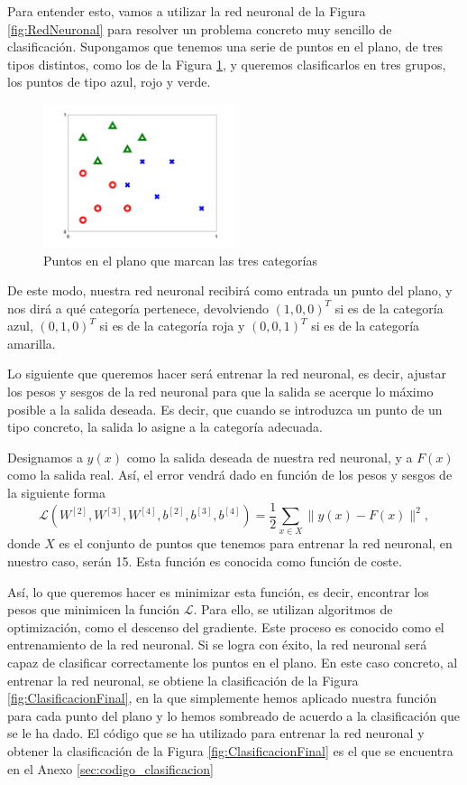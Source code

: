 \documentclass[a4paper,11pt,spanish, twoside, leqno]{tfg-uam}
\theoremstyle{definition}
\begin{document}
Para entender esto, vamos a utilizar la red neuronal de la Figura \ref{fig:RedNeuronal} para resolver un problema concreto muy sencillo de clasificación. Supongamos que tenemos una serie de puntos en el plano, de tres tipos distintos, como los de la Figura \ref{fig:Clasificacion}, y queremos clasificarlos en tres grupos, los puntos de tipo azul, rojo y verde.


\begin{figure}
    \centering
    \includegraphics[width=0.5\textwidth]{Figuras/pic_xy.png}
    \caption{Puntos en el plano que marcan las tres categorías}
    \label{fig:Clasificacion}
\end{figure}

De este modo, nuestra red neuronal recibirá como entrada un punto del plano, y nos dirá a qué categoría pertenece, devolviendo $(1,0,0)^T$ si es de la categoría azul, $(0,1,0)^T$ si es de la categoría roja y $(0,0,1)^T$ si es de la categoría amarilla.

Lo siguiente que queremos hacer será entrenar la red neuronal, es decir, ajustar los pesos y sesgos de la red neuronal para que la salida se acerque lo máximo posible a la salida deseada. Es decir, que cuando se introduzca un punto de un tipo concreto, la salida lo asigne a la categoría adecuada. 

Designamos a $y(x)$ como la salida deseada de nuestra red neuronal, y a $F(x)$ como la salida real. Así, el error vendrá dado en función de los pesos y sesgos de la siguiente forma
\begin{equation*}
    \mathcal{L}(W^{[2]},W^{[3]},W^{[4]},b^{[2]},b^{[3]},b^{[4]})=\frac{1}{2}\sum_{x\in X}\|y(x)-F(x)\|^2,
\end{equation*}
donde $X$ es el conjunto de puntos que tenemos para entrenar la red neuronal, en nuestro caso, serán 15. Esta función es conocida como función de coste.

Así, lo que queremos hacer es minimizar esta función, es decir, encontrar los pesos que minimicen la función $\mathcal{L}$. Para ello, se utilizan algoritmos de optimización, como el descenso del gradiente. Este proceso es conocido como el entrenamiento de la red neuronal. Si se logra con éxito, la red neuronal será capaz de clasificar correctamente los puntos en el plano. En este caso concreto, al entrenar la red neuronal, se obtiene la clasificación de la Figura \ref{fig:ClasificacionFinal}, en la que simplemente hemos aplicado nuestra función para cada punto del plano y lo hemos sombreado de acuerdo a la clasificación que se le ha dado. El código que se ha utilizado para entrenar la red neuronal y obtener la clasificación de la Figura \ref{fig:ClasificacionFinal} es el que se encuentra en el Anexo \ref{sec:codigo_clasificacion}
\end{document}
